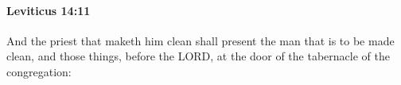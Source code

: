 
		\paragraph{Leviticus 14:11} %
			\label{LEVITICUS-14-11}

			And the priest that maketh him clean shall present the man that is to be made clean, and those things, before the LORD, at the door of the tabernacle of the congregation:


